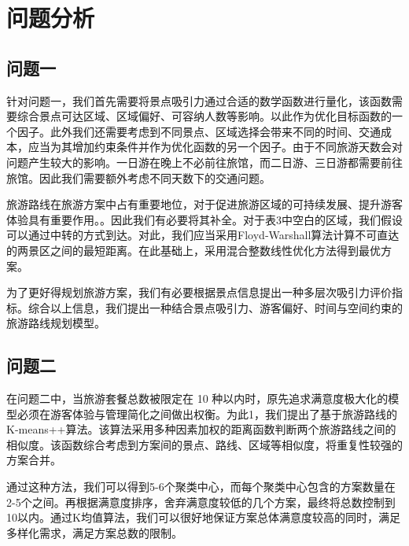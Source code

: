 \chapter[\hspace{0pt}问题分析]{{\heiti{}\hspace{0pt}问题分析}}\label{chapter1: 问题分析}
\removelofgap
\removelotgap

\section[\hspace{-2pt}问题一]{{\heiti{} \hspace{-8pt}问题一}}\label{section1: 问题一}

针对问题一，我们首先需要将景点吸引力通过合适的数学函数进行量化，该函数需要综合景点可达区域、区域偏好、可容纳人数等影响。以此作为优化目标函数的一个因子。此外我们还需要考虑到不同景点、区域选择会带来不同的时间、交通成本，应当为其增加约束条件并作为优化函数的另一个因子。由于不同旅游天数会对问题产生较大的影响。一日游在晚上不必前往旅馆，而二日游、三日游都需要前往旅馆。因此我们需要额外考虑不同天数下的交通问题。

旅游路线在旅游方案中占有重要地位，对于促进旅游区域的可持续发展、提升游客体验具有重要作用。\cite{1024525101.nh}。因此我们有必要将其补全。对于表3中空白的区域，我们假设可以通过中转的方式到达。对此，我们应当采用Floyd‑Warshall算法计算不可直达的两景区之间的最短距离。在此基础上，采用混合整数线性优化方法得到最优方案。

为了更好得规划旅游方案，我们有必要根据景点信息提出一种多层次吸引力评价指标。\cite{CHRK202403007}综合以上信息，我们提出一种结合景点吸引力、游客偏好、时间与空间约束的旅游路线规划模型。

\section[\hspace{-2pt}问题二]{{\heiti{} \hspace{-8pt}问题二}}\label{section1: 问题二}

在问题二中，当旅游套餐总数被限定在 10 种以内时，原先追求满意度极大化的模型必须在游客体验与管理简化之间做出权衡。为此1，我们提出了基于旅游路线的K-means++算法。该算法采用多种因素加权的距离函数判断两个旅游路线之间的相似度。该函数综合考虑到方案间的景点、路线、区域等相似度，将重复性较强的方案合并。

通过这种方法，我们可以得到5-6个聚类中心，而每个聚类中心包含的方案数量在2-5个之间。再根据满意度排序，舍弃满意度较低的几个方案，最终将总数控制到10以内。通过K均值算法，我们可以很好地保证方案总体满意度较高的同时，满足多样化需求，满足方案总数的限制。
